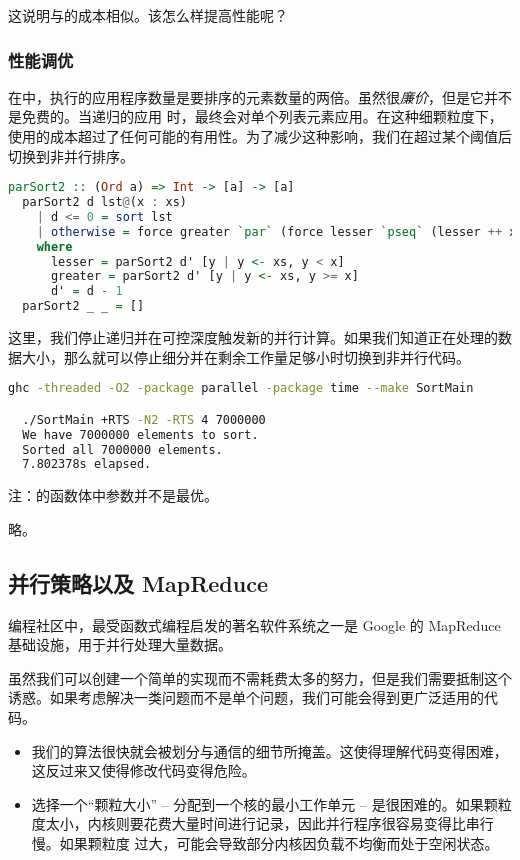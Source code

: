 \documentclass[./main.tex]{subfiles}
\begin{document}
这说明与的成本相似。该怎么样提高性能呢？

\subsubsection*{性能调优}

在中，执行的应用程序数量是要排序的元素数量的两倍。虽然很\textit{廉价}，但是它并不是免费的。当递归的应用
时，最终会对单个列表元素应用。在这种细颗粒度下，使用的成本超过了任何可能的有用性。为了减少这种影响，我们在超过某个阈值后切换到非并行排序。

\begin{lstlisting}[language=Haskell]
  parSort2 :: (Ord a) => Int -> [a] -> [a]
  parSort2 d lst@(x : xs)
    | d <= 0 = sort lst
    | otherwise = force greater `par` (force lesser `pseq` (lesser ++ x : greater))
    where
      lesser = parSort2 d' [y | y <- xs, y < x]
      greater = parSort2 d' [y | y <- xs, y >= x]
      d' = d - 1
  parSort2 _ _ = []
\end{lstlisting}

这里，我们停止递归并在可控深度触发新的并行计算。如果我们知道正在处理的数据大小，那么就可以停止细分并在剩余工作量足够小时切换到非并行代码。

\begin{lstlisting}[language=Bash]
  ghc -threaded -O2 -package parallel -package time --make SortMain

  ./SortMain +RTS -N2 -RTS 4 7000000
  We have 7000000 elements to sort.
  Sorted all 7000000 elements.
  7.802378s elapsed.
\end{lstlisting}

注：的函数体中参数并不是最优。

略。

\subsection*{并行策略以及 MapReduce}

编程社区中，最受函数式编程启发的著名软件系统之一是 Google 的 MapReduce 基础设施，用于并行处理大量数据。

虽然我们可以创建一个简单的实现而不需耗费太多的努力，但是我们需要抵制这个诱惑。如果考虑解决一类问题而不是单个问题，我们可能会得到更广泛适用的代码。

\begin{itemize}
  \item 我们的算法很快就会被划分与通信的细节所掩盖。这使得理解代码变得困难，这反过来又使得修改代码变得危险。
  \item 选择一个“颗粒大小” -- 分配到一个核的最小工作单元 -- 是很困难的。如果颗粒度太小，内核则要花费大量时间进行记录，因此并行程序很容易变得比串行慢。如果颗粒度
        过大，可能会导致部分内核因负载不均衡而处于空闲状态。
\end{itemize}
\end{document}
